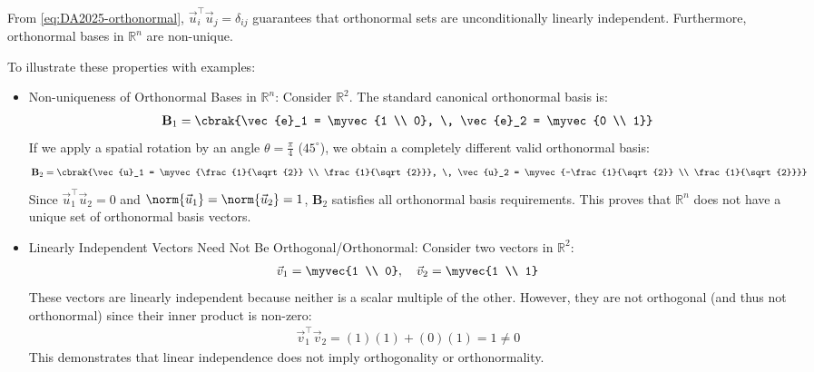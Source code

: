 \begin{enumerate}[label=\thesubsection.\arabic*, ref=\thesubsection.\theenumi]
\solution
From \eqref{eq:DA2025-orthonormal}, $\vec{u}_i^\top \vec{u}_j = \delta_{ij}$ guarantees that orthonormal sets are unconditionally linearly independent. Furthermore, orthonormal bases in $\mathbb{R}^n$ are non-unique.

To illustrate these properties with examples:
\begin{itemize}
	\item Non-uniqueness of Orthonormal Bases in $\mathbb{R}^n$:
	Consider $\mathbb{R}^2$. The standard canonical orthonormal basis is:
	\begin{align}
		\mathbf{B}_1 = \cbrak{\vec{e}_1 = \myvec{1 \\ 0}, \, \vec{e}_2 = \myvec{0 \\ 1}}
	\end{align}
	If we apply a spatial rotation by an angle $\theta = \frac{\pi}{4}$ ($45^\circ$), we obtain a completely different valid orthonormal basis:
	\begin{align}
		\mathbf{B}_2 = \cbrak{\vec{u}_1 = \myvec{\frac{1}{\sqrt{2}} \\ \frac{1}{\sqrt{2}}}, \, \vec{u}_2 = \myvec{-\frac{1}{\sqrt{2}} \\ \frac{1}{\sqrt{2}}}}
	\end{align}
	Since $\vec{u}_1^\top \vec{u}_2 = 0$ and $\norm{\vec{u}_1} = \norm{\vec{u}_2} = 1$, $\mathbf{B}_2$ satisfies all orthonormal basis requirements. This proves that $\mathbb{R}^n$ does not have a unique set of orthonormal basis vectors.
	
	\item Linearly Independent Vectors Need Not Be Orthogonal/Orthonormal:
	Consider two vectors in $\mathbb{R}^2$:
	\begin{align}
		\vec{v}_1 = \myvec{1 \\ 0}, \quad \vec{v}_2 = \myvec{1 \\ 1}
	\end{align}
	These vectors are linearly independent because neither is a scalar multiple of the other. However, they are not orthogonal (and thus not orthonormal) since their inner product is non-zero:
	\begin{align}
		\vec{v}_1^\top \vec{v}_2 = (1)(1) + (0)(1) = 1 \neq 0
	\end{align}
	This demonstrates that linear independence does not imply orthogonality or orthonormality.
\end{itemize}
	

\end{enumerate}
